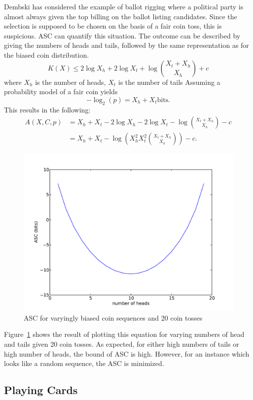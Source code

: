 Dembski \citep{Dembski1998} has considered the example of ballot rigging where a political party is almost always given the top billing on the ballot listing candidates.
Since the selection is supposed to be chosen on the basis of a fair coin toss, this is suspicious.
ASC can quantify this situation.
The outcome can be described by giving the numbers of heads and tails, followed by the same representation as for the biased coin distribution.
\begin{equation}
    K(X) \leq 2 \log X_h + 2 \log X_t + \log {X_t + X_h \choose X_h} + c
\end{equation} where $X_h$ is the number of heads, $X_t$ is the number of tails
Assuming a probability model of a fair coin yields
\begin{equation}
    -\log_2(p) = X_h + X_t \mbox{bits.}
\end{equation}
This results in the following:
\begin{align}
    A(X,C,p) &= X_h + X_t - 2 \log X_h -  2 \log X_t - \log {X_t + X_h \choose X_h} - c \nonumber \\
    &= X_h + X_t - \log \left( X_h^2 X_t^2 {X_t + X_h \choose X_h} \right) - c \mbox{.}
\end{align}
\begin{figure}
    \begin{center}
        \includegraphics[width=.5\textwidth]{EwertCoin}
    \end{center}
    \caption{ASC for varyingly biased coin sequences and 20 coin tosses}
    \label{fig_coins}
\end{figure}

\noindent Figure~\ref{fig_coins} shows the result of plotting this equation for varying numbers of head and tails given 20 coin tosses.
As expected, for either high numbers of tails or high number of heads, the bound of ASC is high.
However, for an instance which looks like a random sequence, the ASC is minimized.


\subsection{Playing Cards}

